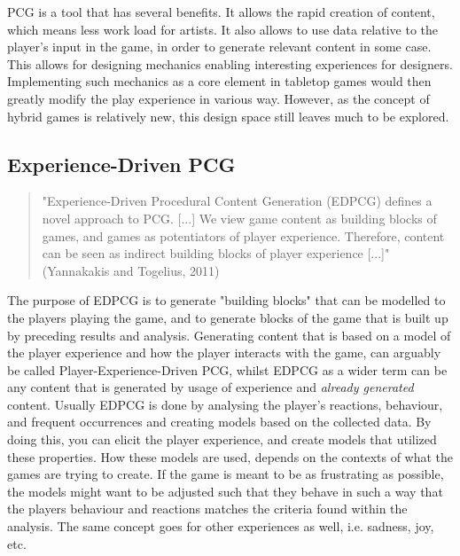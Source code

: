 PCG is a tool that has several benefits. It allows the rapid creation of content, which means less work load for artists. It also allows to use data relative to the player's input in the game, in order to generate relevant content in some case. This allows for designing mechanics enabling interesting experiences for designers. Implementing such mechanics as a core element in tabletop games would then greatly modify the play experience in various way. However, as the concept of hybrid games is relatively new, this design space still leaves much to be explored.

\subsection{Experience-Driven PCG}
\begin{quotation} 
"Experience-Driven Procedural Content Generation (EDPCG) defines a novel approach to PCG. [...] We view game content as building blocks of games, and games as potentiators of player experience. Therefore, content can be seen as indirect building blocks of player experience [...]" (Yannakakis and Togelius, 2011) \cite{art:edpcg}
\end{quotation}

The purpose of EDPCG is to generate "building blocks" that can be modelled to the players playing the game, and to generate blocks of the game that is built up by preceding results and analysis. Generating content that is based on a model of the player experience and how the player interacts with the game, can arguably be called Player-Experience-Driven PCG, whilst EDPCG as a wider term can be any content that is generated by usage of experience and \textit{already generated} content. Usually EDPCG is done by analysing the player's reactions, behaviour, and frequent occurrences and creating models based on the collected data. By doing this, you can elicit the player experience, and create models that utilized these properties. How these models are used, depends on the contexts of what the games are trying to create. If the game is meant to be as frustrating as possible, the models might want to be adjusted such that they behave in such a way that the players behaviour and reactions matches the criteria found within the analysis. The same concept goes for other experiences as well, i.e. sadness, joy, etc.

